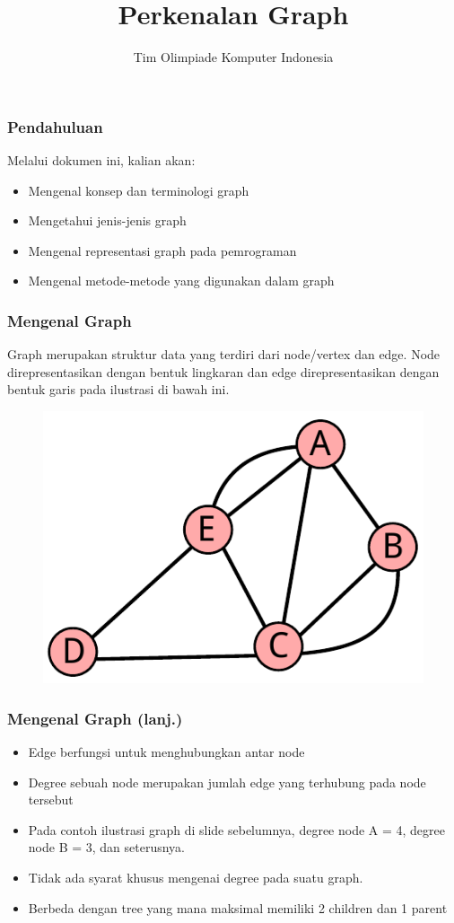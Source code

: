 

\title{Perkenalan Graph}
\author{Tim Olimpiade Komputer Indonesia}
\date{}

\usepackage{verbatim}



\begin{frame}
\titlepage
\end{frame}

\begin{frame}
\frametitle{Pendahuluan}
Melalui dokumen ini, kalian akan:
\begin{itemize}
  \item Mengenal konsep dan terminologi graph
  \item Mengetahui jenis-jenis graph
  \item Mengenal representasi graph pada pemrograman
  \item Mengenal metode-metode yang digunakan dalam graph
\end{itemize}

\end{frame}

\begin{frame}
\frametitle{Mengenal Graph}
Graph merupakan struktur data yang terdiri dari \alert{node/vertex} dan \alert{edge}. Node direpresentasikan dengan bentuk lingkaran dan edge direpresentasikan dengan bentuk garis pada ilustrasi di bawah ini.

\begin{figure}
  \centering
  \includegraphics[width=6 cm]{asset/graph.pdf}
\end{figure}
\end{frame}

\begin{frame}
\frametitle{Mengenal Graph (lanj.)}
\begin{itemize}
  \item Edge berfungsi untuk menghubungkan antar node
  \item \alert{Degree} sebuah node merupakan jumlah edge yang terhubung pada node tersebut
  \item Pada contoh ilustrasi graph di slide sebelumnya, degree node A = 4, degree node B = 3, dan seterusnya.
  \item Tidak ada syarat khusus mengenai degree pada suatu graph.
  \item Berbeda dengan tree yang mana maksimal memiliki 2 children dan 1 parent
\end{itemize}

\end{frame}

